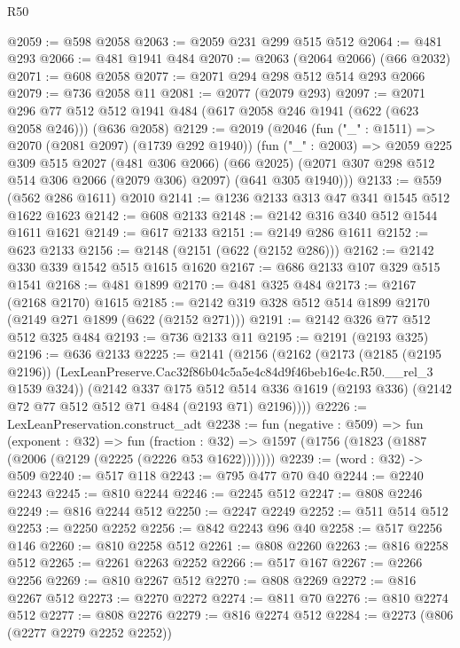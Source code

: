 \begin{lexlean}{R50}
\begin{coremodule}
@2059 := @598 @2058
@2063 := @2059 @231 @299 @515 @512
@2064 := @481 @293
@2066 := @481 @1941 @484
@2070 := @2063 (@2064 @2066) (@66 @2032)
@2071 := @608 @2058
@2077 := @2071 @294 @298 @512 @514 @293 @2066
@2079 := @736 @2058 @11
@2081 := @2077 (@2079 @293)
@2097 := @2071
    @296
    @77
    @512
    @512
    @1941
    @484
    (@617 @2058 @246 @1941 (@622 (@623 @2058 @246)))
    (@636 @2058)
@2129 := @2019
    (@2046
      (fun ("_" : @1511) => @2070 (@2081 @2097) (@1739 @292 @1940))
      (fun ("_" : @2003) =>
      @2059
        @225
        @309
        @515
        @2027
        (@481 @306 @2066)
        (@66 @2025)
        (@2071 @307 @298 @512 @514 @306 @2066 (@2079 @306) @2097)
        (@641 @305 @1940)))
@2133 := @559 (@562 @286 @1611) @2010
@2141 := @1236 @2133 @313 @47 @341 @1545 @512 @1622 @1623
@2142 := @608 @2133
@2148 := @2142 @316 @340 @512 @1544 @1611 @1621
@2149 := @617 @2133
@2151 := @2149 @286 @1611
@2152 := @623 @2133
@2156 := @2148 (@2151 (@622 (@2152 @286)))
@2162 := @2142 @330 @339 @1542 @515 @1615 @1620
@2167 := @686 @2133 @107 @329 @515 @1541
@2168 := @481 @1899
@2170 := @481 @325 @484
@2173 := @2167 (@2168 @2170) @1615
@2185 := @2142 @319 @328 @512 @514 @1899 @2170 (@2149 @271 @1899 (@622 (@2152 @271)))
@2191 := @2142 @326 @77 @512 @512 @325 @484
@2193 := @736 @2133 @11
@2195 := @2191 (@2193 @325)
@2196 := @636 @2133
@2225 := @2141
    (@2156
      (@2162
        (@2173
          (@2185 (@2195 @2196))
          (LexLeanPreserve.Cac32f86b04c5a5e4c84d9f46beb16e4c.R50.__rel_3 @1539 @324))
        (@2142
          @337
          @175
          @512
          @514
          @336
          @1619
          (@2193 @336)
          (@2142 @72 @77 @512 @512 @71 @484 (@2193 @71) @2196))))
@2226 := LexLeanPreservation.construct_adt
@2238 := fun (negative : @509) =>
  fun (exponent : @32) =>
  fun (fraction : @32) => @1597 (@1756 (@1823 (@1887 (@2006 (@2129 (@2225 (@2226 @53 @1622)))))))
@2239 := (word : @32) -> @509
@2240 := @517 @118
@2243 := @795 @477 @70 @40
@2244 := @2240 @2243
@2245 := @810 @2244
@2246 := @2245 @512
@2247 := @808 @2246
@2249 := @816 @2244 @512
@2250 := @2247 @2249
@2252 := @511 @514 @512
@2253 := @2250 @2252
@2256 := @842 @2243 @96 @40
@2258 := @517 @2256 @146
@2260 := @810 @2258 @512
@2261 := @808 @2260
@2263 := @816 @2258 @512
@2265 := @2261 @2263 @2252
@2266 := @517 @167
@2267 := @2266 @2256
@2269 := @810 @2267 @512
@2270 := @808 @2269
@2272 := @816 @2267 @512
@2273 := @2270 @2272
@2274 := @811 @70
@2276 := @810 @2274 @512
@2277 := @808 @2276
@2279 := @816 @2274 @512
@2284 := @2273 (@806 (@2277 @2279 @2252 @2252))

\end{coremodule}
\end{lexlean}
